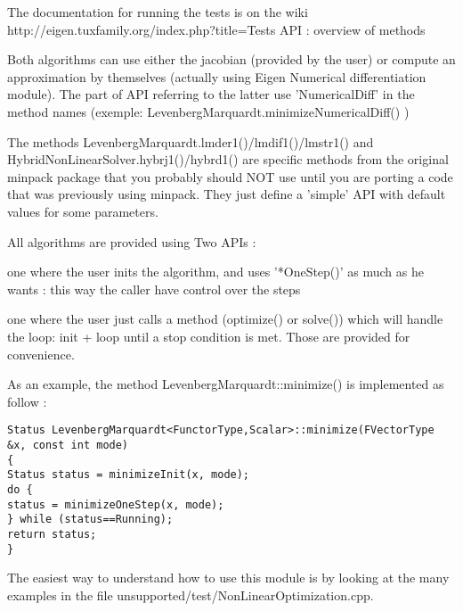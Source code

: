 The documentation for running the tests is on the wiki http://eigen.tuxfamily.org/index.php?title=Tests
API : overview of methods

Both algorithms can use either the jacobian (provided by the user) or compute an approximation by themselves (actually using Eigen Numerical differentiation module). The part of API referring to the latter use 'NumericalDiff' in the method names (exemple: LevenbergMarquardt.minimizeNumericalDiff() )

The methods LevenbergMarquardt.lmder1()/lmdif1()/lmstr1() and HybridNonLinearSolver.hybrj1()/hybrd1() are specific methods from the original minpack package that you probably should NOT use until you are porting a code that was previously using minpack. They just define a 'simple' API with default values for some parameters.

All algorithms are provided using Two APIs :

one where the user inits the algorithm, and uses '*OneStep()' as much as he wants : this way the caller have control over the steps

one where the user just calls a method (optimize() or solve()) which will handle the loop: init + loop until a stop condition is met. Those are provided for convenience.

As an example, the method LevenbergMarquardt::minimize() is implemented as follow :

\begin{lstlisting}
Status LevenbergMarquardt<FunctorType,Scalar>::minimize(FVectorType &x, const int mode)
{
Status status = minimizeInit(x, mode);
do {
status = minimizeOneStep(x, mode);
} while (status==Running);
return status;
}
\end{lstlisting}


The easiest way to understand how to use this module is by looking at the many examples in the file unsupported/test/NonLinearOptimization.cpp. 


